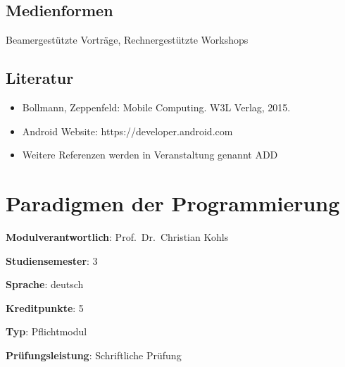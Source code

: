 \hypertarget{medienformenpathlabelmi-2017modulbeschreibungen-bachelorba_mobile-computing}{%
\section*{Medienformen\label{/mi-2017/modulbeschreibungen-bachelor/BA_Mobile-Computing}}\label{medienformenpathlabelmi-2017modulbeschreibungen-bachelorba_mobile-computing}}

Beamergestützte Vorträge, Rechnergestützte Workshops

\hypertarget{literaturpathlabelmi-2017modulbeschreibungen-bachelorba_mobile-computing}{%
\section*{Literatur\label{/mi-2017/modulbeschreibungen-bachelor/BA_Mobile-Computing}}\label{literaturpathlabelmi-2017modulbeschreibungen-bachelorba_mobile-computing}}

\begin{itemize}
\tightlist
\item
  Bollmann, Zeppenfeld: Mobile Computing. W3L Verlag, 2015.
\item
  Android Website: https://developer.android.com
\item
  Weitere Referenzen werden in Veranstaltung genannt ADD
\end{itemize}

\hypertarget{paradigmen-der-programmierungpathlabelmi-2017modulbeschreibungen-bachelorba_paradigmen-der-programmierung}{%
\chapter{Paradigmen der
Programmierung\label{/mi-2017/modulbeschreibungen-bachelor/BA_Paradigmen-der-Programmierung}}\label{paradigmen-der-programmierungpathlabelmi-2017modulbeschreibungen-bachelorba_paradigmen-der-programmierung}}

\begin{modulHead}
\textbf{Modulverantwortlich}: Prof.~Dr.~Christian
Kohls
\end{modulHead}
\begin{modulHead}
\textbf{Studiensemester}:
3
\end{modulHead}
\begin{modulHead}
\textbf{Sprache}:
deutsch
\end{modulHead}
\begin{modulHead}
\textbf{Kreditpunkte}:
5
\end{modulHead}
\begin{modulHead}
\textbf{Typ}:
Pflichtmodul
\end{modulHead}
\begin{modulHead}
\textbf{Prüfungsleistung}:
Schriftliche Prüfung
\end{modulHead}


